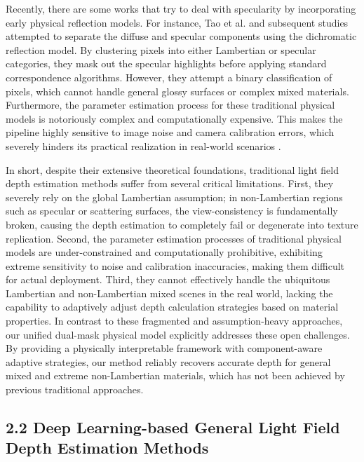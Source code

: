 Recently, there are some works that try to deal with specularity by incorporating early physical reflection models. For instance, Tao et al.  and subsequent studies  attempted to separate the diffuse and specular components using the dichromatic reflection model. By clustering pixels into either Lambertian or specular categories, they mask out the specular highlights before applying standard correspondence algorithms. However, they attempt a binary classification of pixels, which cannot handle general glossy surfaces or complex mixed materials. Furthermore, the parameter estimation process for these traditional physical models is notoriously complex and computationally expensive. This makes the pipeline highly sensitive to image noise and camera calibration errors, which severely hinders its practical realization in real-world scenarios .

In short, despite their extensive theoretical foundations, traditional light field depth estimation methods suffer from several critical limitations. First, they severely rely on the global Lambertian assumption; in non-Lambertian regions such as specular or scattering surfaces, the view-consistency is fundamentally broken, causing the depth estimation to completely fail or degenerate into texture replication. Second, the parameter estimation processes of traditional physical models are under-constrained and computationally prohibitive, exhibiting extreme sensitivity to noise and calibration inaccuracies, making them difficult for actual deployment. Third, they cannot effectively handle the ubiquitous Lambertian and non-Lambertian mixed scenes in the real world, lacking the capability to adaptively adjust depth calculation strategies based on material properties. In contrast to these fragmented and assumption-heavy approaches, our unified dual-mask physical model explicitly addresses these open challenges. By providing a physically interpretable framework with component-aware adaptive strategies, our method reliably recovers accurate depth for general mixed and extreme non-Lambertian materials, which has not been achieved by previous traditional approaches.

\subsection{2.2 Deep Learning-based General Light Field Depth Estimation Methods}

